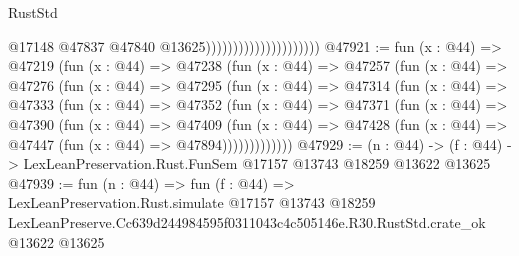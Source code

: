 \begin{lexlean}{RustStd}
\begin{coremodule}
                                              @17148
                                              @47837
                                              @47840
                                              @13625)))))))))))))))))))))
@47921 := fun (x : @44) =>
  @47219
    (fun (x : @44) =>
    @47238
      (fun (x : @44) =>
      @47257
        (fun (x : @44) =>
        @47276
          (fun (x : @44) =>
          @47295
            (fun (x : @44) =>
            @47314
              (fun (x : @44) =>
              @47333
                (fun (x : @44) =>
                @47352
                  (fun (x : @44) =>
                  @47371
                    (fun (x : @44) =>
                    @47390
                      (fun (x : @44) =>
                      @47409
                        (fun (x : @44) =>
                        @47428 (fun (x : @44) => @47447 (fun (x : @44) => @47894)))))))))))))
@47929 := (n : @44) ->
  (f : @44) -> LexLeanPreservation.Rust.FunSem @17157 @13743 @18259 @13622 @13625
@47939 := fun (n : @44) =>
  fun (f : @44) =>
  LexLeanPreservation.Rust.simulate
    @17157
    @13743
    @18259
    LexLeanPreserve.Cc639d244984595f0311043c4c505146e.R30.RustStd.crate_ok
    @13622
    @13625
\end{coremodule}
\end{lexlean}
